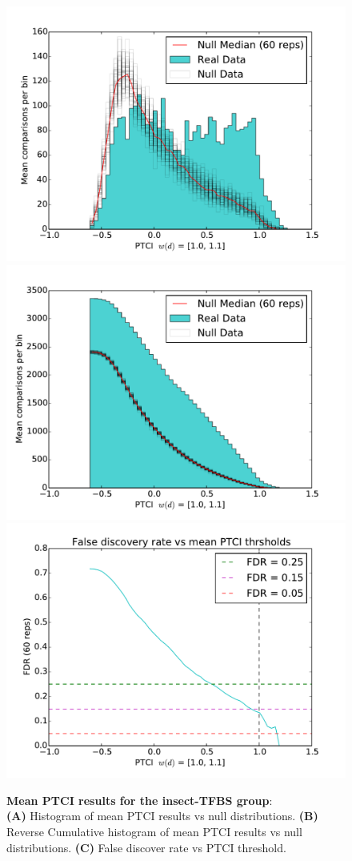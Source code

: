 
\begin{figure}[hp]
\subcaptionbox{\label{fig:insect-mean-ptci-hists-base}}
{\includegraphics[width=.5\linewidth]{figures/figs/jaspar_insect_ptci_20130918_orthodb7/mean_ptci_hist.pdf}}
% 
\subcaptionbox{\label{fig:insect-mean-ptci-hists-rcum-hist}}
{\includegraphics[width=.5\linewidth]{figures/figs/jaspar_insect_ptci_20130918_orthodb7/mean_ptci_cum_hist.pdf}}
% 
\subcaptionbox{\label{fig:insect-mean-ptci-hists-fdr}}
{\includegraphics[width=.5\linewidth]{figures/figs/jaspar_insect_ptci_20130918_orthodb7/mean_ptci_fdr.pdf}}
% 
% 
\caption[Mean insect-PTCI results]{\sf \textbf{Mean PTCI results for the insect-\gls{TFBS} group}:\\
\textbf{(A)} Histogram of mean PTCI results vs null distributions.
\textbf{(B)} Reverse Cumulative histogram of mean PTCI results vs null distributions.
\textbf{(C)} False discover rate vs PTCI threshold.}
\label{fig:insect-mean-ptci-hists}
\end{figure}